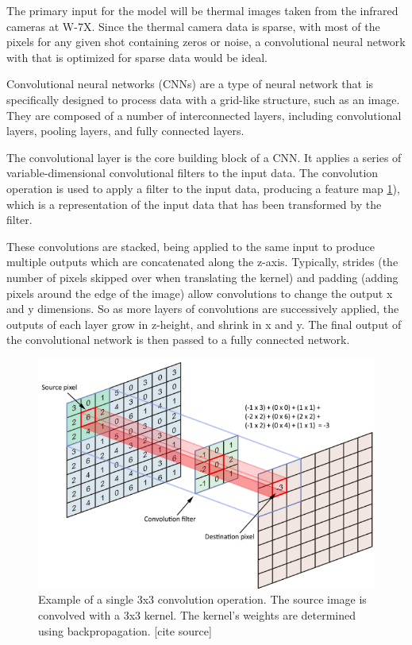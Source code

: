 The primary input for the model will be thermal images taken from the infrared cameras at W-7X. Since the thermal camera data is sparse, with most of the pixels for any given shot containing zeros or noise, a convolutional neural network with that is optimized for sparse data would be ideal.

Convolutional neural networks (CNNs) are a type of neural network that is specifically designed to process data with a grid-like structure, such as an image. They are composed of a number of interconnected layers, including convolutional layers, pooling layers, and fully connected layers.

The convolutional layer is the core building block of a CNN. It applies a series of variable-dimensional convolutional filters to the input data. The convolution operation is used to apply a filter to the input data, producing a feature map \ref{fig:code:2DConv}), which is a representation of the input data that has been transformed by the filter.

These convolutions are stacked, being applied to the same input to produce multiple outputs which are concatenated along the z-axis. Typically, strides (the number of pixels skipped over when translating the kernel) and padding (adding pixels around the edge of the image) allow convolutions to change the output x and y dimensions. So as more layers of convolutions are successively applied, the outputs of each layer grow in z-height, and shrink in x and y. The final output of the convolutional network is then passed to a fully connected network.


\begin{figure}[htb]
    \includegraphics[width=\textwidth]{images/2d-Conv.png}
    \caption{Example of a single 3x3 convolution operation. The source image is convolved with a 3x3 kernel. The kernel's weights are determined using backpropagation. [cite source]}
    \label{fig:code:2DConv}
\end{figure}


